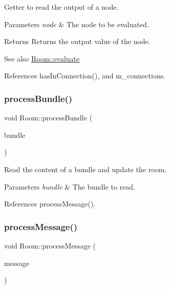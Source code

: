 Getter to read the output of a node. 


\begin{DoxyParams}{Parameters}
{\em node} & The node to be evaluated. \\
\hline
\end{DoxyParams}
\begin{DoxyReturn}{Returns}
Returns the output value of the node. 
\end{DoxyReturn}
\begin{DoxySeeAlso}{See also}
\mbox{\hyperlink{classRoom_a0f8b282b43bd3115e24f6b9bd95d92a9}{Room\+::evaluate}} 
\end{DoxySeeAlso}


References has\+In\+Connection(), and m\+\_\+connections.

\mbox{\label{classRoom_a700df071feffa282696e156791dd0d87}} 
\subsubsection{\texorpdfstring{process\+Bundle()}{processBundle()}}
{\footnotesize\ttfamily void Room\+::process\+Bundle (\begin{DoxyParamCaption}\item[{Osc\+Bundle $\ast$}]{bundle }\end{DoxyParamCaption})\hspace{0.3cm}{\ttfamily [private]}}



Read the content of a bundle and update the room. 


\begin{DoxyParams}{Parameters}
{\em bundle} & The bundle to read. \\
\hline
\end{DoxyParams}


References process\+Message().

\mbox{\label{classRoom_ab498f123e988e3596722b0e088507b80}} 
\subsubsection{\texorpdfstring{process\+Message()}{processMessage()}}
{\footnotesize\ttfamily void Room\+::process\+Message (\begin{DoxyParamCaption}\item[{Osc\+Message $\ast$}]{message }\end{DoxyParamCaption})\hspace{0.3cm}{\ttfamily [private]}}




